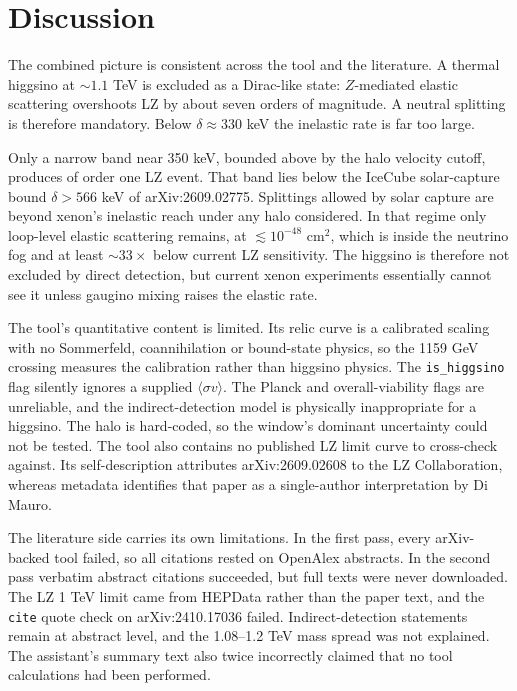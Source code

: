 \documentclass[11pt,a4paper]{article}
\begin{document}
\section{Discussion}
The combined picture is consistent across the tool and the literature. A thermal higgsino at $\sim1.1$ TeV is excluded as a Dirac-like state: $Z$-mediated elastic scattering overshoots LZ by about seven orders of magnitude. A neutral splitting is therefore mandatory. Below $\delta\approx330$ keV the inelastic rate is far too large.

Only a narrow band near 350 keV, bounded above by the halo velocity cutoff, produces of order one LZ event. That band lies below the IceCube solar-capture bound $\delta>566$ keV of arXiv:2609.02775. Splittings allowed by solar capture are beyond xenon's inelastic reach under any halo considered. In that regime only loop-level elastic scattering remains, at $\lesssim10^{-48}$ cm$^2$, which is inside the neutrino fog and at least $\sim33\times$ below current LZ sensitivity. The higgsino is therefore not excluded by direct detection, but current xenon experiments essentially cannot see it unless gaugino mixing raises the elastic rate.

The tool's quantitative content is limited. Its relic curve is a calibrated scaling with no Sommerfeld, coannihilation or bound-state physics, so the 1159 GeV crossing measures the calibration rather than higgsino physics. The \texttt{is\_higgsino} flag silently ignores a supplied $\langle\sigma v\rangle$. The Planck and overall-viability flags are unreliable, and the indirect-detection model is physically inappropriate for a higgsino. The halo is hard-coded, so the window's dominant uncertainty could not be tested. The tool also contains no published LZ limit curve to cross-check against. Its self-description attributes arXiv:2609.02608 to the LZ Collaboration, whereas metadata identifies that paper as a single-author interpretation by Di Mauro.

The literature side carries its own limitations. In the first pass, every arXiv-backed tool failed, so all citations rested on OpenAlex abstracts. In the second pass verbatim abstract citations succeeded, but full texts were never downloaded. The LZ 1 TeV limit came from HEPData rather than the paper text, and the \texttt{cite} quote check on arXiv:2410.17036 failed. Indirect-detection statements remain at abstract level, and the 1.08--1.2 TeV mass spread was not explained. The assistant's summary text also twice incorrectly claimed that no tool calculations had been performed.
\end{document}
